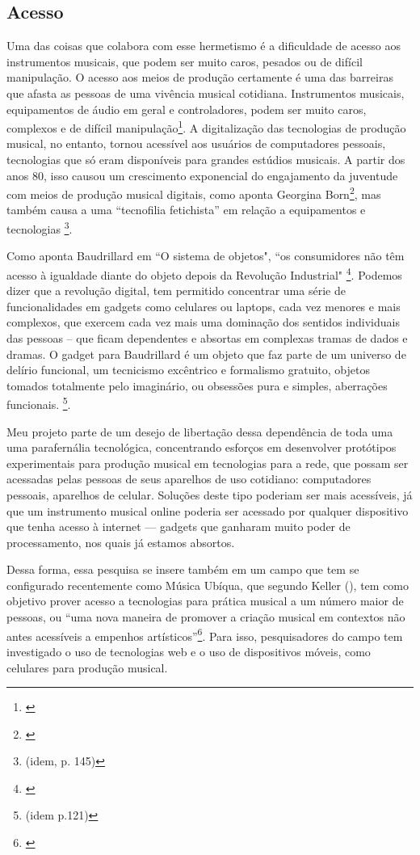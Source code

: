\subsection{Acesso}
Uma das coisas que colabora com esse hermetismo é a dificuldade de acesso aos instrumentos musicais, que podem ser muito caros, pesados ou de difícil manipulação. O acesso aos meios de produção certamente é uma das barreiras que afasta as pessoas de uma vivência musical cotidiana. Instrumentos musicais, equipamentos de áudio em geral e controladores, podem ser muito caros, complexos e de difícil manipulação\footnote{\cite{Fiebrink2007}}. A digitalização das tecnologias de produção musical, no entanto, tornou acessível aos usuários de computadores pessoais, tecnologias que só eram disponíveis para grandes estúdios musicais. A partir dos anos 80, isso causou um crescimento exponencial do engajamento da juventude com meios de produção musical digitais, como aponta Georgina Born\footnote{\cite[143]{Born2015}}, mas também causa a uma ``tecnofilia fetichista'' em relação a equipamentos e tecnologias \footnote{(idem, p. 145)}.

Como aponta Baudrillard em ``O sistema de objetos", ``os consumidores não têm acesso à igualdade diante do objeto depois da Revolução Industrial" \footnote{\cite[162]{Baudrillard2012}}. Podemos dizer que a revolução digital, tem permitido concentrar uma série de funcionalidades em gadgets como celulares ou laptops, cada vez menores e mais complexos, que exercem cada vez mais uma dominação dos sentidos individuais das pessoas – que ficam dependentes e absortas em complexas tramas de dados e dramas. O gadget para Baudrillard é um objeto que faz parte de um universo de delírio funcional, um tecnicismo excêntrico e formalismo gratuito, objetos tomados totalmente pelo imaginário, ou obsessões pura e simples, aberrações funcionais. \footnote{(idem p.121)}. 

Meu projeto parte de um desejo de libertação dessa dependência de toda uma uma parafernália tecnológica, concentrando esforços em desenvolver protótipos experimentais para produção musical em tecnologias para a rede, que possam ser acessadas pelas pessoas de seus aparelhos de uso cotidiano: computadores pessoais, aparelhos de celular. Soluções deste tipo poderiam ser mais acessíveis, já que um instrumento musical online poderia ser acessado por qualquer dispositivo que tenha acesso à internet --- gadgets que ganharam muito poder de processamento, nos quais já estamos absortos. 

Dessa forma, essa pesquisa se insere também em um campo que tem se configurado recentemente como Música Ubíqua, que segundo Keller (\citeyear{Keller2018}), tem como objetivo prover acesso a tecnologias para prática musical a um número maior de pessoas, ou ``uma nova maneira de promover a criação musical em contextos não antes acessíveis a empenhos artísticos''\footnote{\cite{Keller2018}}. Para isso, pesquisadores do campo tem investigado o uso de tecnologias web e o uso de dispositivos móveis, como celulares para produção musical. 

